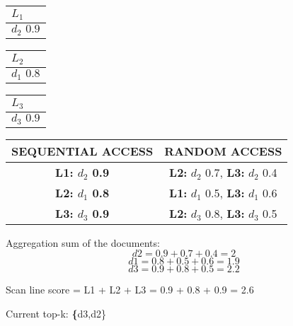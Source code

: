 \begin{center}
    \begin{minipage}[t]{2cm}
        \begin{tabular}{|p{25pt}|}\hline
          $L_1$\\\hline
          $d_2 \, \, 0.9$\\\hline
        \end{tabular}
    \end{minipage}
    \hspace{5mm}
    \begin{minipage}[t]{2cm}
        \begin{tabular}{|p{25pt}|}\hline
          $L_2$\\\hline
          $d_1 \, \, 0.8$\\\hline
            \end{tabular}
    \end{minipage}
    \hspace{5mm}
    \begin{minipage}[t]{2cm}
        \begin{tabular}{|p{25pt}|}\hline
        $L_3$\\\hline
        $d_3 \, \, 0.9$\\\hline      
        \end{tabular}
    \end{minipage}
    \end{center}
\begin{center}
  \begin{tabular}{ |c|c| } 
    \hline
     \textbf{SEQUENTIAL ACCESS} & \textbf{RANDOM ACCESS}  \\ [0.5ex] 
    \hline\hline
    \textbf{ L1: $d_2$ 0.9} &  \textbf{L2:} $d_2$ 0.7, \textbf{L3:} $d_2$ 0.4 \\ 
     \hline
     \textbf{ L2: $d_1$ 0.8} &  \textbf{L1:} $d_1$ 0.5,\textbf{ L3:} $d_1$ 0.6 \\
     \hline
      \textbf{ L3: $d_3$ 0.9} & \textbf{ L2:} $d_3$ 0.8, \textbf{L3:} $d_3$ 0.5 \\
    \hline
   \end{tabular}
\end{center}  


Aggregation sum of the documents:
\[d2 = 0.9 + 0.7 + 0.4 = 2 \]
\[d1 = 0.8 + 0.5 + 0.6 = 1.9 \] 
\[d3 = 0.9 + 0.8 + 0.5 = 2.2 \]

Scan line score = L1 + L2 + L3 = 0.9 + 0.8 + 0.9 = 2.6

Current top-k: \textbf\{{d3,d2}\}

